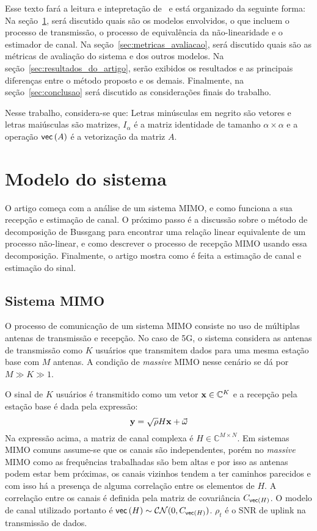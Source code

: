 \documentclass{article}
\begin{document}
	Esse texto fará a leitura e intepretação de~\cite{li.etal_2017a} e está organizado da seguinte forma:
	Na seção~\ref{sec:modelo_sistema}, será discutido quais são os modelos envolvidos, o que incluem o processo de transmissão, o processo de equivalência da não-linearidade e o estimador de canal. 
	Na seção~\ref{sec:metricas_avaliacao}, será discutido quais são as métricas de avaliação do sistema e dos outros modelos. 
	Na seção~\ref{sec:resultados_do_artigo}, serão exibidos os resultados e as principais diferenças entre o método proposto e os demais. 
	Finalmente, na seção~\ref{sec:conclusao} será discutido as considerações finais do trabalho.

	Nesse trabalho, considera-se que:
	Letras minúsculas em negrito são vetores e letras maiúsculas são matrizes,
	$I_\alpha$ é a matriz identidade de tamanho $\alpha\times\alpha$ e
	a operação $ \mathsf{vec} \left( A \right) $ é a vetorização da matriz $A$.

	\section{Modelo do sistema}
	\label{sec:modelo_sistema}
	
	O artigo começa com a análise de um sistema MIMO, e como funciona a sua recepção e estimação de canal. O próximo passo é a discussão sobre o método de decomposição de Bussgang para encontrar uma relação linear equivalente de um processo não-linear, e como descrever o processo de recepção MIMO usando essa decomposição. Finalmente, o artigo mostra como é feita a estimação de canal e estimação do sinal.

	\subsection{Sistema MIMO}
	\label{sec:modelo_sistema_mimo}

	O processo de comunicação de um sistema MIMO consiste no uso de múltiplas antenas de transmissão e recepção. No caso de 5G, o sistema considera as antenas de transmissão como $K$ usuários que transmitem dados para uma mesma estação base com $M$ antenas. A condição de \textit{massive} MIMO nesse cenário se dá por $M\gg K\gg1$.   

	O sinal de $K$ usuários é transmitido como um vetor $\mathbf{x}\in\mathbb{C}^{K}$ e a recepção pela estação base é dada pela expressão:
	\begin{equation}
		\mathbf{y}=\sqrt{\rho}H\mathbf{x}+\vec{\omega}
		\label{eq:recepcao_sinal_mimo}
	\end{equation}
	Na expressão acima, a matriz de canal complexa é $H\in\mathbb{C}^{M\times N}$. Em sistemas MIMO comuns assume-se que os canais são independentes, porém no \textit{massive} MIMO como as frequências trabalhadas são bem altas e por isso as antenas podem estar bem próximas, os canais vizinhos tendem a ter caminhos parecidos e com isso há a presença de alguma correlação entre os elementos de $H$. A correlação entre os canais é definida pela matriz de covariância $C_{ \mathsf{vec} \left( H \right) }$. O modelo de canal utilizado portanto é $ \mathsf{vec} \left( H \right) \sim\mathcal{C}\mathcal{N}(0,C_{ \mathsf{vec} \left( H \right) })$. $\rho_t$ é o SNR de uplink na transmissão de dados.
	
\end{document}
